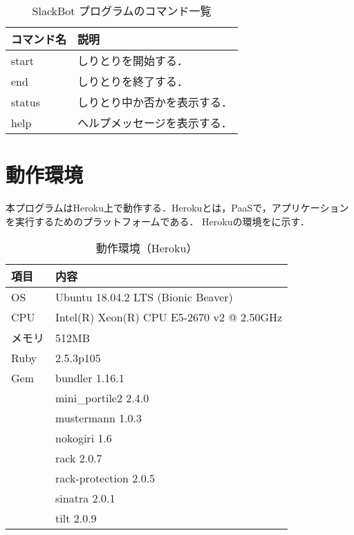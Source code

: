 \documentclass[12pt]{jsarticle}
\begin{document}
\begin{table}
  \begin{center}
    \caption{SlackBot プログラムのコマンド一覧}\label{tab:command}
    \begin{tabular}{l|l}
      \hline
      \hline
      コマンド名 & 説明\\
      \hline
      start & しりとりを開始する．\\
      end & しりとりを終了する．\\
      status & しりとり中か否かを表示する．\\
      help & ヘルプメッセージを表示する．\\
      \hline
    \end{tabular}
  \end{center}
\end{table}



\section{動作環境}\label{sec:environment}
本プログラムはHeroku上で動作する．Herokuとは，PaaSで，アプリケーションを実行するためのプラットフォームである．
Herokuの環境をに示す．

\begin{table}
  \begin{center}
    \caption{動作環境（Heroku）}\label{tab:environment}
    \begin{tabular}{l|l}
      \hline
      \hline
      項目 & 内容\\
      \hline
      OS & Ubuntu 18.04.2 LTS (Bionic Beaver)\\
      CPU & Intel(R) Xeon(R) CPU E5-2670 v2 @ 2.50GHz\\
      メモリ & 512MB\\
      Ruby & 2.5.3p105\\
      Gem & bundler 1.16.1\\
          & mini\_portile2 2.4.0\\
          & mustermann 1.0.3\\
          & nokogiri 1.6\\
          & rack 2.0.7\\
          & rack-protection 2.0.5\\
          & sinatra 2.0.1\\
          & tilt 2.0.9\\
      \hline
    \end{tabular}
  \end{center}
\end{table}
\end{document}
